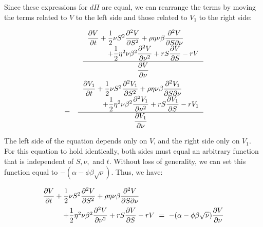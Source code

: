 \documentclass[uplatex,a4j,12pt,dvipdfmx]{jsarticle}
\begin{document}
Since these expressions for $d\Pi$ are equal, we can rearrange the terms by moving the terms related to $V$ to the left side and those related to $V_{1}$ to the right side:

\begin{eqnarray*}
	&&
	\dfrac{
		\left.
		\begin{array}{l}
			\dfrac{\partial V}{\partial t}
			+
			\dfrac{1}{2}
			\nu S^{2}
			\dfrac{\partial^{2} V}{\partial S^{2}}
			+
			\rho \eta \nu \beta
			\dfrac{\partial^{2} V}{\partial S \partial \nu}
			\\ \hspace{10mm}
			+
			\dfrac{1}{2}
			\eta^{2} \nu \beta^{2}
			\dfrac{\partial^{2} V}{\partial \nu^{2}}
			+
			rS \dfrac{\partial V}{\partial S}
			-rV
		\end{array}
		\right.
	}{
		\dfrac{\partial V}{\partial \nu}
	}
	\\ &=&
	\dfrac{
		\left.
		\begin{array}{l}
			\dfrac{\partial V_{1}}{\partial t}
			+
			\dfrac{1}{2}
			\nu S^{2}
			\dfrac{\partial^{2} V_{1}}{\partial S^{2}}
			+
			\rho \eta \nu \beta
			\dfrac{\partial^{2} V_{1}}{\partial S \partial \nu}
			\\ \hspace{10mm}
			+
			\dfrac{1}{2}
			\eta^{2} \nu \beta^{2}
			\dfrac{\partial^{2} V_{1}}{\partial \nu^{2}}
			+
			rS \dfrac{\partial V_{1}}{\partial S}
			-rV_{1}
		\end{array}
		\right.
	}{
		\dfrac{\partial V_{1}}{\partial \nu}
	}
\end{eqnarray*}

The left side of the equation depends only on $V$, and the right side only on $V_{1}$. For this equation to hold identically, both sides must equal an arbitrary function that is independent of $S, \nu,$ and $t$. Without loss of generality, we can set this function equal to $- (\alpha - \phi \beta \sqrt{\nu})$. Thus, we have:

\begin{eqnarray*}
	\begin{array}{l}
		\dfrac{\partial V}{\partial t}
		+
		\dfrac{1}{2}
		\nu S^{2}
		\dfrac{\partial^{2} V}{\partial S^{2}}
		+
		\rho \eta \nu \beta
		\dfrac{\partial^{2} V}{\partial S \partial \nu}
		\\[3mm] \hspace{10mm}
		+
		\dfrac{1}{2}
		\eta^{2} \nu \beta^{2}
		\dfrac{\partial^{2} V}{\partial \nu^{2}}
		+
		rS \dfrac{\partial V}{\partial S}
		-rV
		\ = \
		- (\alpha - \phi \beta \sqrt{\nu})
		\dfrac{\partial V}{\partial \nu}
	\end{array}
\end{eqnarray*}
\end{document}
